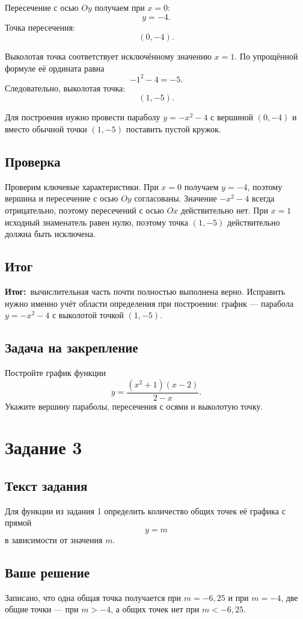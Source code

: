 \documentclass[12pt,a4paper]{article}
\newcommand{\resultlabel}{\textcolor{teal!60!black}{\textbf{Итог:}}}
\begin{document}
Пересечение с осью $Oy$ получаем при $x=0$:
\[
y=-4.
\]
Точка пересечения:
\[
(0,-4).
\]

Выколотая точка соответствует исключённому значению $x=1$. По упрощённой формуле её ордината равна
\[
-1^2-4=-5.
\]
Следовательно, выколотая точка:
\[
(1,-5).
\]

Для построения нужно провести параболу $y=-x^2-4$ с вершиной $(0,-4)$ и вместо обычной точки $(1,-5)$ поставить пустой кружок.

\subsection*{Проверка}
Проверим ключевые характеристики. При $x=0$ получаем $y=-4$, поэтому вершина и пересечение с осью $Oy$ согласованы. Значение $-x^2-4$ всегда отрицательно, поэтому пересечений с осью $Ox$ действительно нет. При $x=1$ исходный знаменатель равен нулю, поэтому точка $(1,-5)$ действительно должна быть исключена.

\subsection*{Итог}
\resultlabel\ вычислительная часть почти полностью выполнена верно. Исправить нужно именно учёт области определения при построении: график --- парабола $y=-x^2-4$ с выколотой точкой $(1,-5)$.

\subsection*{Задача на закрепление}
Постройте график функции
\[
y=\frac{(x^2+1)(x-2)}{2-x}.
\]
Укажите вершину параболы, пересечения с осями и выколотую точку.

\newpage
{}\label{task:3}
\section*{Задание 3}

\subsection*{Текст задания}
Для функции из задания 1 определить количество общих точек её графика с прямой
\[
y=m
\]
в зависимости от значения $m$.

\subsection*{Ваше решение}
Записано, что одна общая точка получается при $m=-6{,}25$ и при $m=-4$, две общие точки --- при $m>-4$, а общих точек нет при $m<-6{,}25$.
\end{document}
